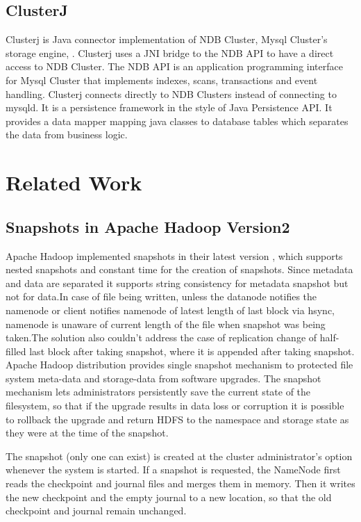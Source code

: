 \subsection{ClusterJ}
Clusterj  is   Java  connector  implementation  of  NDB  Cluster,  Mysql  Cluster’s   storage  engine, \cite{29}.  Clusterj  uses   a  JNI  bridge  to  the  NDB  API  to  have  a  direct  access   to  NDB
Cluster.  The  NDB  API  is   an  application  programming  interface  for  Mysql  Cluster  that
implements   indexes,  scans,  transactions   and  event  handling.  Clusterj  connects   directly   to
NDB  Clusters   instead  of  connecting  to  mysqld.  It  is   a  persistence  framework   in  the  style of
Java  Persistence  API.  It  provides   a  data  mapper  mapping  java  classes   to  database  tables
which separates the data from business logic.

\section{Related Work}
\subsection{Snapshots in Apache Hadoop Version2}
Apache Hadoop implemented snapshots in their latest version \cite{Hadoop2} , which supports nested snapshots and constant time for the creation of snapshots. Since metadata and data are separated it supports string consistency for metadata snapshot but not for data.In case of file being written, unless the datanode notifies the namenode or client notifies namenode of latest length of last block via hsync, namenode is unaware of current length of the file when snapshot was being taken.The solution also couldn't address the case of replication change of half-filled last block after taking snapshot, where it is appended after taking snapshot.\\
Apache Hadoop distribution provides single snapshot mechanism to protected file system meta-data and storage-data from software upgrades. The snapshot mechanism lets administrators persistently save the current state of the filesystem, so that if the upgrade results in data loss or corruption it is possible to rollback the upgrade and return HDFS to the namespace and storage state as they were at the time of the snapshot.

The snapshot (only one can exist) is created at the cluster administrator's option whenever the system is started. If a snapshot is requested, the NameNode first reads the checkpoint and journal files and merges them in memory. Then it writes the new checkpoint and the empty journal to a new location, so that the old checkpoint and journal remain unchanged.

